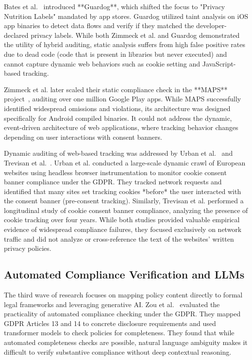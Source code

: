 \documentclass[11pt,a4paper]{article}
\begin{document}
Bates et al.~\cite{bates-2020-guardog} introduced **Guardog**, which shifted the focus to "Privacy Nutrition Labels" mandated by app stores. Guardog utilized taint analysis on iOS app binaries to detect data flows and verify if they matched the developer-declared privacy labels. While both Zimmeck et al. and Guardog demonstrated the utility of hybrid auditing, static analysis suffers from high false positive rates due to dead code (code that is present in libraries but never executed) and cannot capture dynamic web behaviors such as cookie setting and JavaScript-based tracking.

Zimmeck et al. later scaled their static compliance check in the **MAPS** project~\cite{zimmeck-2021-maps}, auditing over one million Google Play apps. While MAPS successfully identified widespread omissions and violations, its architecture was designed specifically for Android compiled binaries. It could not address the dynamic, event-driven architecture of web applications, where tracking behavior changes depending on user interactions with consent banners.

Dynamic auditing of web-based tracking was addressed by Urban et al.~\cite{urban-2021-cookies} and Trevisan et al.~\cite{trevisan-2019-cookies}. Urban et al. conducted a large-scale dynamic crawl of European websites using headless browser instrumentation to monitor cookie consent banner compliance under the GDPR. They tracked network requests and identified that many sites set tracking cookies *before* the user interacted with the consent banner (pre-consent tracking). Similarly, Trevisan et al. performed a longitudinal study of cookie consent banner compliance, analyzing the presence of cookie tracking over four years. While both studies provided valuable empirical evidence of widespread compliance failures, they focused exclusively on network traffic and did not analyze or cross-reference the text of the websites' written privacy policies.

\subsection{Automated Compliance Verification and LLMs}
The third wave of research focuses on mapping policy content directly to formal legal frameworks and leveraging generative AI. Zou et al.~\cite{zou-2023-compliance} evaluated the practicality of automated compliance checking under the GDPR. They mapped GDPR Articles 13 and 14 to concrete disclosure requirements and used transformer models to check policies for completeness. They found that while automated completeness checks are possible, natural language ambiguity makes it difficult to verify substantive compliance without deep contextual reasoning.
\end{document}

